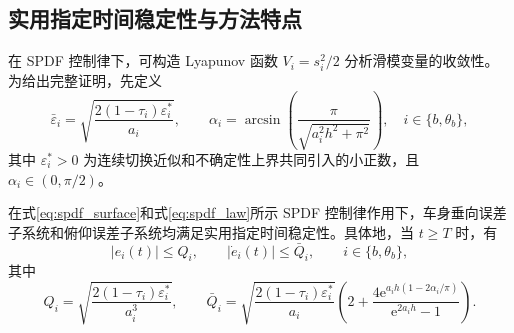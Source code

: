 \subsection{实用指定时间稳定性与方法特点}
在 SPDF 控制律下，可构造 Lyapunov 函数 $V_i=s_i^2/2$ 分析滑模变量的收敛性。为给出完整证明，先定义
\begin{equation}
\bar\varepsilon_i=\sqrt{\frac{2(1-\tau_i)\varepsilon_i^\ast}{a_i}},
\qquad
\alpha_i=\arcsin\left(\frac{\pi}{\sqrt{a_i^2h^2+\pi^2}}\right),
\quad i\in\{b,\theta_b\},
\label{eq:spdf_eps_alpha}
\end{equation}
其中 $\varepsilon_i^\ast>0$ 为连续切换近似和不确定性上界共同引入的小正数，且 $\alpha_i\in(0,\pi/2)$。

\begin{theorem}
\label{thm:spdf_practical_pt}
在式\eqref{eq:spdf_surface}和式\eqref{eq:spdf_law}所示 SPDF 控制律作用下，车身垂向误差子系统和俯仰误差子系统均满足实用指定时间稳定性。具体地，当 $t\geq T$ 时，有
\begin{equation}
|e_i(t)|\leq Q_i,\qquad |\dot e_i(t)|\leq \bar Q_i,\qquad i\in\{b,\theta_b\},
\label{eq:spdf_bound}
\end{equation}
其中
\begin{equation}
Q_i=\sqrt{\frac{2(1-\tau_i)\varepsilon_i^\ast}{a_i^3}},
\qquad
\bar Q_i=
\sqrt{\frac{2(1-\tau_i)\varepsilon_i^\ast}{a_i}}
\left(
2+\frac{4\mathrm e^{a_ih(1-2\alpha_i/\pi)}}{\mathrm e^{2a_ih}-1}
\right).
\label{eq:spdf_Q}
\end{equation}
\end{theorem}

